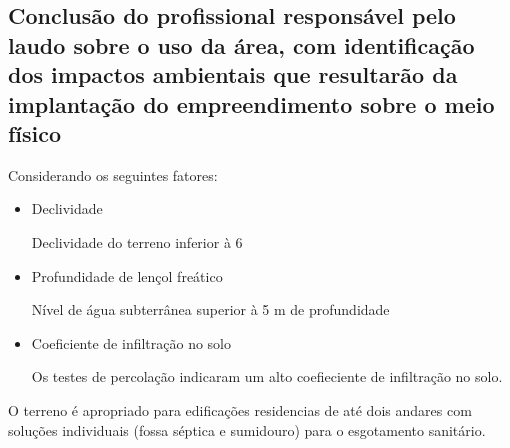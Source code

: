 \subsection{Conclusão do profissional responsável pelo laudo sobre o uso da área, com identificação dos impactos ambientais que resultarão da implantação do empreendimento sobre o meio físico}

Considerando os seguintes fatores:
\begin{itemize}
	\item Declividade

Declividade do terreno inferior à 6%

\item Profundidade de lençol freático

Nível de água subterrânea superior à 5 m de profundidade

\item Coeficiente de infiltração no solo

Os testes de percolação indicaram um alto coefieciente de  infiltração no solo.

\end{itemize}
O terreno é apropriado para edificações residencias de até dois andares com soluções individuais (fossa séptica e sumidouro) para o esgotamento sanitário.
